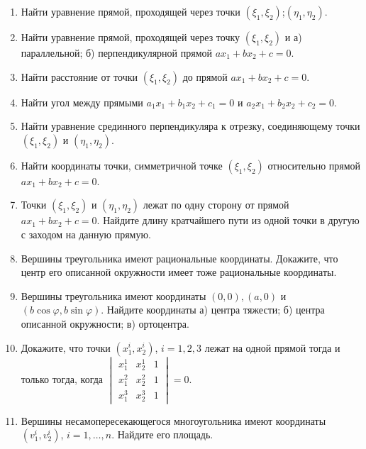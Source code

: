 	\begin{enumerate}
		\item Найти уравнение прямой, проходящей через точки $(\xi_1, \xi_2)$;$ (\eta_1, \eta_2)$.

		\item Найти уравнение прямой, проходящей через точку $(\xi_1, \xi_2)$ и а) параллельной; б) перпендикулярной прямой $ax_1 + bx_2 + c = 0$.

		\item Найти расстояние от точки $(\xi_1, \xi_2)$ до прямой $ax_1 + bx_2 + c = 0$.

		\item Найти угол между прямыми $a_1x_1 + b_1x_2 + c_1 = 0$ и $a_2x_1 + b_2x_2 + c_2 = 0$.

		\item Найти уравнение срединного перпендикуляра к отрезку, соединяющему точки $(\xi_1, \xi_2)$ и $(\eta_1, \eta_2)$.

		\item Найти координаты точки, симметричной точке $(\xi_1, \xi_2)$ относительно прямой $ax_1 + bx_2 + c = 0$.

		\item Точки $(\xi_1, \xi_2)$ и $(\eta_1, \eta_2)$ лежат по одну сторону от прямой $ax_1 + bx_2 + c = 0$. Найдите длину кратчайшего пути из одной точки в другую с заходом на данную прямую.

		\item Вершины треугольника имеют рациональные координаты. Докажите, что центр его описанной окружности имеет тоже рациональные координаты.

		\item Вершины треугольника имеют координаты $(0,0), (a,0)$ и\\ $(b \cos \varphi, b \sin \varphi)$. Найдите координаты а) центра тяжести; б) центра описанной окружности; в) ортоцентра.

		\item Докажите, что точки $(x^i_1, x^i_2)$, $i=1,2,3$ лежат на одной прямой тогда и только тогда, когда $
		\begin{vmatrix}
			x^1_1 & x^1_2 & 1 \\
			x^2_1 & x^2_2 & 1 \\
			x^3_1 & x^3_2 & 1
		\end{vmatrix} = 0$.

		\item Вершины несамопересекающегося многоугольника имеют координаты $(v^i_1, v^i_2)$, $i=1, \dots, n$. Найдите его площадь.


\end{enumerate}
